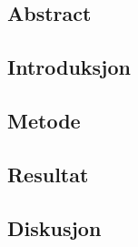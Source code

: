 \documentclass {article}
\begin{document}
\subsection {Abstract}
    
\subsection {Introduksjon}

\subsection {Metode}

\subsection {Resultat}

\subsection {Diskusjon}
\end{document}
